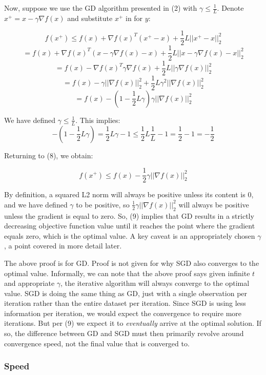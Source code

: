 \documentclass{article}
\begin{document}
Now, suppose we use the GD algorithm presented in (2) with $\gamma \leq
\frac{1}{L}$. Denote $x^+ = x - \gamma \nabla
f(x)$ and substitute $x^+$ in for $y$:

$$ f(x^+) \leq f(x) + \nabla f(x)^T(x^+ - x) + \frac{1}{2}L||x^+ - x||_2^2 $$
$$ = f(x) + \nabla f(x)^T(x - \gamma \nabla f(x) - x) + \frac{1}{2}L||x - \gamma \nabla f(x) - x||_2^2 $$
$$ = f(x) - \nabla f(x)^T \gamma \nabla f(x)  + \frac{1}{2}L||\gamma \nabla f(x)||_2^2 $$
$$ = f(x) - \gamma||\nabla f(x)||_2^2 + \frac{1}{2} L \gamma^2||\nabla f(x)||_2^2$$
\begin{equation}
= f(x) - (1 - \frac{1}{2}L\gamma)\gamma||\nabla f(x)||_2^2 
\end{equation}

We have defined $\gamma \leq \frac{1}{L}$. This implies:
$$
-(1 - \frac{1}{2}L \gamma) = \frac{1}{2}L \gamma - 1
\leq \frac{1}{2}L\frac{1}{L} - 1
= \frac{1}{2} - 1
= - \frac{1}{2}
$$

Returning to (8), we obtain:

\begin{equation}
f(x^+) \leq f(x) - \frac{1}{2}\gamma||\nabla f(x)||_2^2
\end{equation}

By definition, a squared L2 norm will always be positive unless its content is
0, and we have defined $\gamma$ to be positive, so $\frac{1}{2} \gamma||\nabla f(x)||_2^2$ will always be positive unless the
gradient is equal to zero. So, (9) implies that GD results in a strictly
decreasing objective function value until it reaches the point where the
gradient equals zero, which is the optimal value. A key caveat is an
appropriately chosen $\gamma$, a point covered in more detail later.

The above proof is for GD. Proof is not given for why SGD also
converges to the optimal value. Informally, we can note that the above proof
says given infinite $t$ and appropriate $\gamma$, the iterative algorithm will
always converge to the optimal value. SGD is doing the same thing as GD, 
just with a single observation per iteration 
rather than the entire dataset per iteration. Since SGD is using less information
per iteration, we would expect the convergence to require more iterations. But
per (9) we expect it to \textit{eventually} arrive at the optimal solution.
If so, the difference between GD and SGD must then primarily revolve
around convergence speed, not the final value that is converged to.

\subsubsection{Speed}
\end{document}
